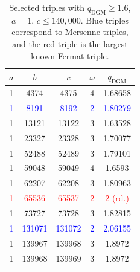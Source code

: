\documentclass[11pt,letterpaper]{amsart}
\begin{document}
\begin{table}[t]
\centering\small
\begin{tabular}{|c|c|c|c|c|}
\hline
$a$ & $b$ & $c$ & $\omega$ & $q_{\mathrm{DGM}}$ \\
\hline
1 & 4374   & 4375   & 4 & 1.68658 \\
\textcolor{blue}{1} & \textcolor{blue}{8191}   & \textcolor{blue}{8192}   & \textcolor{blue}{2} & \textcolor{blue}{1.80279} \\
1 & 13121  & 13122  & 3 & 1.63528 \\
1 & 23327  & 23328  & 3 & 1.70077 \\
1 & 52488  & 52489  & 3 & 1.79101 \\
1 & 59048  & 59049  & 4 & 1.6593  \\
1 & 62207  & 62208  & 3 & 1.80963 \\
\textcolor{red}{1} & \textcolor{red}{65536}  & \textcolor{red}{65537}  & \textcolor{red}{2} & \textcolor{red}{2 (rd.)} \\
1 & 73727  & 73728  & 3 & 1.82815 \\
\textcolor{blue}{1} & \textcolor{blue}{131071}   & \textcolor{blue}{131072}   & \textcolor{blue}{2} & \textcolor{blue}{2.06155} \\
1 & 139967 & 139968 & 3 & 1.8972  \\
1 & 139968 & 139969 & 3 & 1.8972 \\
\hline
\end{tabular}
\caption{Selected triples with $q_{\mathrm{DGM}}\ge 1.6$, $a=1$, $c\le 140{,}000$. Blue triples correspond to Mersenne triples, and the red triple is the largest known Fermat triple.}
\label{Table_2}
\end{table}
\end{document}
